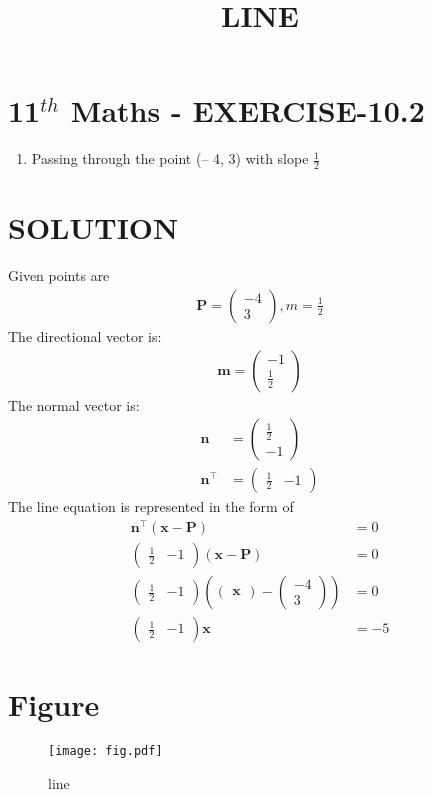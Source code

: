 \documentclass[12pt]{article}
\providecommand{\brak}[1]{\ensuremath{\left(#1\right)}}
\newcommand{\myvec}[1]{\ensuremath{\begin{pmatrix}#1\end{pmatrix}}}
\let\vec\mathbf
\begin{document}
\begin{center}
\title{\textbf{LINE}}
\date{\vspace{-5ex}} %
\maketitle
\end{center}

\section{11$^{th}$ Maths - EXERCISE-10.2}
\begin{enumerate}
\item Passing through the point (– 4, 3) with slope $\frac{1}{2}$
\end{enumerate}
\section{SOLUTION}
Given points are 
\begin{align}
\vec{P}=\myvec{-4\\ 3},
m=\frac{1}{2}
\end{align}
The directional vector is:
\begin{align}
\vec{m}=\myvec{-1\\ \frac{1}{2}}
\end{align}
The normal vector is:
\begin{align}
\vec{n}&=\myvec{\frac{1}{2}\\ -1}\\
	\vec{n}^\top&=\myvec{\frac{1}{2}& -1}	
\end{align}
The line equation is represented in the form of 
\begin{align}
\vec{n}^\top \brak{\vec{x}-\vec{P}}&= 0 \\
\myvec{\frac{1}{2}& -1}\brak{\vec{x}-\vec{P}}&=0\\ 
\myvec{\frac{1}{2}&-1}\brak{\myvec{\vec{x}}-\myvec{-4\\3}}&=0\\   
\myvec{\frac{1}{2}&-1}{\vec{x}}&=-5
\end{align}
\section{Figure}
\begin{figure}[h]
\centering
\texttt{[image: fig.pdf]}
\caption{line}
		\label{fig:Figure}
\end{figure}
\end{document}

